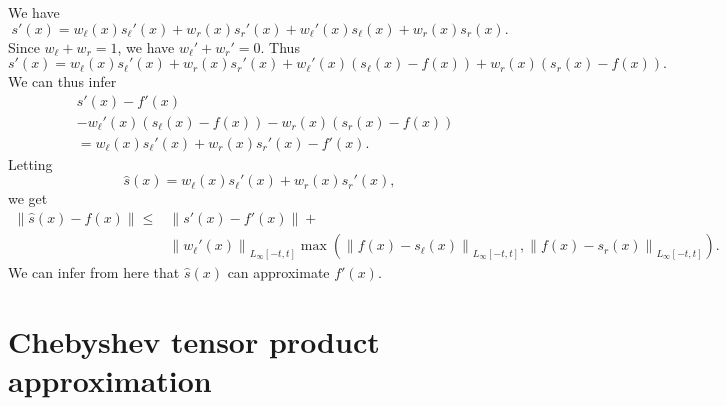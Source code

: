 \documentclass{article}
\newcommand{\lp}{\left(}
\newcommand{\rp}{\right)}
\begin{document}
 We have
\begin{equation}
s'(x) = w_{\ell}(x)s_{\ell}'(x) + w_{r}(x)s_{r}'(x) + w_{\ell}'(x)s_{\ell}(x) + w_{r}(x)s_{r}(x).
\end{equation}
Since $w_{\ell}+w_{r}=1$, we have $w_{\ell}'+w_{r}'=0$. Thus
\begin{equation}
s'(x) = w_{\ell}(x)s_{\ell}'(x) + w_{r}(x)s_{r}'(x) + w_{\ell}'(x)(s_{\ell}(x)-f(x)) + w_{r}(x)(s_{r}(x)-f(x)).
\end{equation}
We can thus infer
\begin{equation}
\begin{aligned}
& s'(x) - f'(x)  \\
& - w_{\ell}'(x)(s_{\ell}(x)-f(x)) - w_{r}(x)(s_{r}(x)-f(x))   \\ &=w_{\ell}(x)s_{\ell}'(x) + w_{r}(x)s_{r}'(x) - f'(x).	
\end{aligned}
\end{equation}
Letting
\begin{equation}
\hat{s}(x) = w_{\ell}(x)s_{\ell}'(x) + w_{r}(x)s_{r}'(x),
\end{equation}
we get
\begin{equation}
\begin{aligned}
\| \hat{s}(x) - f(x) \| \leq &\|s'(x)-f'(x) \| + \\ & \left \| w_{\ell}'(x) \right \|_{L_{\infty}[-t,t]} \max \lp \left \| f(x)-s_{\ell}(x)\right \|_{L_{\infty}[-t,t]}
, \left \| f(x)-s_{r}(x)\right \|_{L_{\infty}[-t,t]} \rp.	
\end{aligned}
\end{equation}
We can infer from here that $\hat{s}(x)$ can approximate $f'(x)$.

\section{Chebyshev tensor product approximation}
\end{document}
